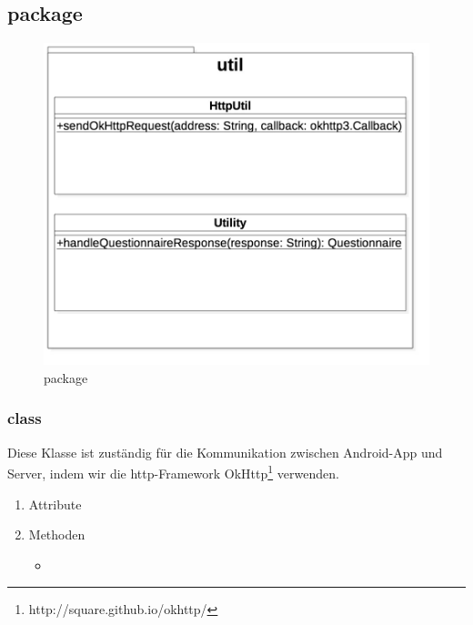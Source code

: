 \documentclass[a4paper]{scrreprt}
\begin{document}
            \newpage
            \subsection{package }

                \vspace*{3cm}
                \begin{figure}[H]
                    \centering
                    \includegraphics[scale = 0.5]{util.jpg}
                    \caption{package }
                \end{figure}

                \subsubsection{class }

                    Diese Klasse ist zuständig für die Kommunikation zwischen Android-App und Server, indem wir die http-Framework OkHttp\footnote{http://square.github.io/okhttp/} verwenden.

                    \begin{enumerate}
                        \item Attribute
                        \item Methoden
                            \begin{itemize}
                                \item {}
                            \end{itemize}
                    \end{enumerate}
\end{document}
